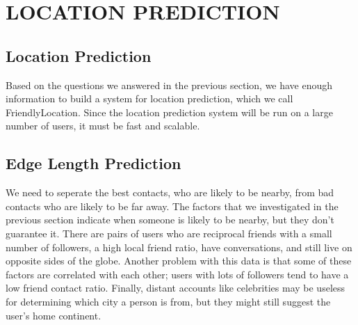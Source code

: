 \ifdefined\THESIS
    \chapter{\uppercase{Location Prediction}}
\else
    \section{Location Prediction}
\fi

Based on the questions we answered in the previous section, we have enough
information to build a system for location prediction, which we call
FriendlyLocation.
Since the location prediction system will be run on a large number of users,
it must be fast and scalable.

\section{Edge Length Prediction}

We need to seperate the best contacts, who are likely to be nearby, from
bad contacts who are likely to be far away.
%
The factors that we investigated in the previous section indicate when someone
is likely to be nearby, but they don't guarantee it.
%
There are pairs of users who are reciprocal friends with a small number of
followers, a high local friend ratio, have conversations, and still live on
opposite sides of the globe.
%
Another problem with this data is that some of these factors are correlated
with each other; users with lots of followers tend to have a low friend contact
ratio.
%
Finally, distant accounts like celebrities may be useless for determining which
city a person is from, but they might still suggest the user's home continent.

